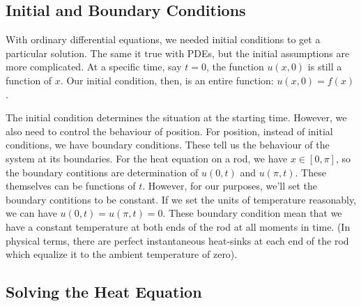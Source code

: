 \documentclass[fleqn,letterpaper]{report}
\begin{document}
\subsection{Initial and Boundary Conditions}
\label{initial-boundary-conditions}

With ordinary differential equations, we needed initial
conditions to get a particular solution. The same it true
with PDEs, but the initial assumptions are more complicated.
At a specific time, say $t=0$, the function $u(x,0)$ is still
a function of $x$. Our initial condition, then, is an entire
function: $u(x,0) = f(x)$.

The initial condition determines the situation at the starting
time. However, we also need to control the behaviour of
position. For position, instead of initial conditions, we have
boundary conditions.  These tell us the behaviour of the
system at its boundaries.  For the heat equation on a rod, we
have $x\in [0,\pi]$, so the boundary contitions are
determination of $u(0,t)$ and $u(\pi,t)$. These themselves can
be functions of $t$. However, for our purposes, we'll set the
boundary contitions to be constant. If we set the units of
temperature reasonably, we can have $u(0,t) = u(\pi,t) = 0$.
These boundary condition mean that we have a constant
temperature at both ends of the rod at all moments in time.
(In physical terms, there are perfect instantaneous heat-sinks
at each end of the rod which equalize it to the ambient
temperature of zero). 

\subsection{Solving the Heat Equation}
\label{sovling-heat-equation}
\end{document}

